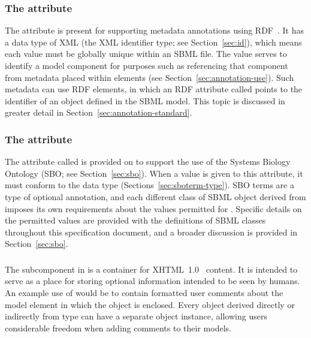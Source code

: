\subsubsection{The  attribute}
\label{sec:metaid}

The  attribute is present for supporting metadata
annotations using RDF~\citep[Resource Description
Format;][]{lassila:1999}.  It has a data type of XML 
(the XML identifier type; see Section~\ref{sec:id}), which means
each  value must be globally unique within an SBML
file.  The  value serves to identify a model
component for purposes such as referencing that component from
metadata placed within  elements (see
Section~\ref{sec:annotation-use}).  Such metadata can use RDF
 elements, in which an RDF attribute called
 points to the  identifier of an
object defined in the SBML model.  This topic is discussed in
greater detail in Section~\ref{sec:annotation-standard}.


\subsubsection{The  attribute}
\label{sec:sbase-sboterm}

The attribute called  is provided on \SBase to
support the use of the Systems Biology Ontology (SBO; see
Section~\ref{sec:sbo}).  When a value is given to this attribute,
it must conform to the data type 
(Sections~\ref{sec:sboterm-type}).  SBO terms are a type of
optional annotation, and each different class of SBML object
derived from \SBase imposes its own requirements about the values
permitted for .  Specific details on the permitted
values are provided with the definitions of SBML classes
throughout this specification document, and a broader discussion
is provided in Section~\ref{sec:sbo}.


\subsubsection{}
\label{sec:notes}

The subcomponent \Notes in \SBase is a container for
XHTML~1.0~\citep{pemberton:2002} content.  It is intended to serve
as a place for storing optional information intended to be seen by
humans.  An example use of \Notes would be to contain formatted
user comments about the model element in which the \Notes object
is enclosed.  Every object derived directly or indirectly from
type \SBase can have a separate \Notes object instance, allowing
users considerable freedom when adding comments to their models.

